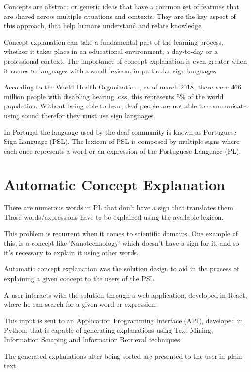 \documentclass[runningheads]{llncs}
\begin{document}
Concepts are abstract or generic ideas that have a common set of features that are shared across multiple situations and contexts.
They are the key aspect of this approach, that help humans understand and relate knowledge.

Concept explanation can take a fundamental part of the learning process, whether it takes place in an educational environment, a day-to-day or a professional context.
The importance of concept explanation is even greater when it comes to languages with a small lexicon, in particular sign languages.

According to the World Health Organization \cite{who_2020}, as of march 2018, there were 466 million people with disabling hearing loss, this represents 5\% of the world population.
Without being able to hear, deaf people are not able to communicate using sound therefor they must use sign languages.

In Portugal the language used by the deaf community is known as Portuguese Sign Language (PSL).
The lexicon of PSL is composed by multiple signs where each once represents a word or an expression of the Portuguese Language (PL).

\section{Automatic Concept Explanation}

There are numerous words in PL that don't have a sign that translates them.
Those words/expressions have to be explained using the available lexicon.

This problem is recurrent when it comes to scientific domains.
One example of this, is a concept like 'Nanotechnology' which doesn't have a sign for it, and so it's necessary to explain it using other words.

Automatic concept explanation was the solution design to aid in the process of explaining a given concept to the users of the PSL.

A user interacts with the solution through a web application, developed in React, where he can search for a given word or expression.

This input is sent to an Application Programming Interface (API), developed in Python, that is capable of generating explanations using Text Mining, Information Scraping and Information Retrieval techniques.

The generated explanations after being sorted are presented to the user in plain text.
\end{document}

